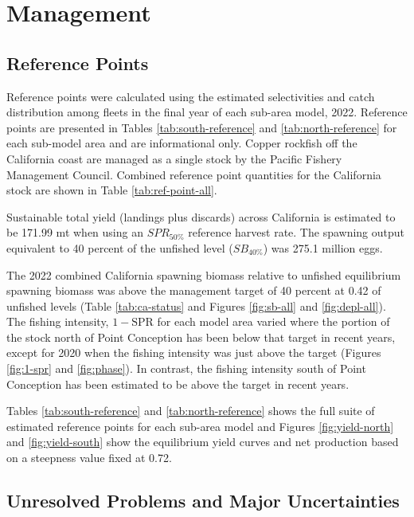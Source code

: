 \documentclass[11pt,
  english,
  letterpaper,
]{article}
\begin{document}
\hypertarget{management}{%
\section{Management}\label{management}}

\hypertarget{reference-points-1}{%
\subsection{Reference Points}\label{reference-points-1}}

Reference points were calculated using the estimated selectivities and catch distribution among fleets in the final year of each sub-area model, 2022. Reference points are presented in Tables \ref{tab:south-reference} and \ref{tab:north-reference} for each sub-model area and are informational only. Copper rockfish off the California coast are managed as a single stock by the Pacific Fishery Management Council. Combined reference point quantities for the California stock are shown in Table \ref{tab:ref-point-all}.

Sustainable total yield (landings plus discards) across California is estimated to be 171.99 mt when using an \(SPR_{50\%}\) reference harvest rate. The spawning output equivalent to 40 percent of the unfished level (\(SB_{40\%}\)) was 275.1 million eggs.

The 2022 combined California spawning biomass relative to unfished equilibrium spawning biomass was above the management target of 40 percent at 0.42 of unfished levels (Table \ref{tab:ca-status} and Figures \ref{fig:sb-all} and \ref{fig:depl-all}). The fishing intensity, \(1-\text{SPR}\) for each model area varied where the portion of the stock north of Point Conception has been below that target in recent years, except for 2020 when the fishing intensity was just above the target (Figures \ref{fig:1-spr} and \ref{fig:phase}). In contrast, the fishing intensity south of Point Conception has been estimated to be above the target in recent years.

Tables \ref{tab:south-reference} and \ref{tab:north-reference} shows the full suite of estimated reference points for each sub-area model and Figures \ref{fig:yield-north} and \ref{fig:yield-south} show the equilibrium yield curves and net production based on a steepness value fixed at 0.72.

\hypertarget{unresolved-problems-and-major-uncertainties-1}{%
\subsection{Unresolved Problems and Major Uncertainties}\label{unresolved-problems-and-major-uncertainties-1}}
\end{document}
